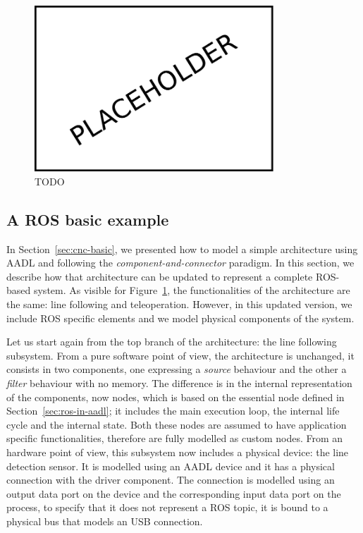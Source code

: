 \begin{figure}[t]
    \centering
    \includegraphics[width=0.8\textwidth]{gfx/placeholder}
    \caption{TODO}\label{fig:ros-arch}
\end{figure}

\subsection{A ROS basic example}
In Section~\ref{sec:cnc-basic}, we presented how to model a simple architecture using AADL and following the \textit{component-and-connector} paradigm. In this section, we describe how that architecture can be updated to represent a complete ROS-based system. As visible for Figure~\ref{fig:ros-arch}, the functionalities of the architecture are the same: line following and teleoperation. However, in this updated version, we include ROS specific elements and we model physical components of the system.

Let us start again from the top branch of the architecture: the line following subsystem. From a pure software point of view, the architecture is unchanged, it consists in two components, one expressing a \textit{source} behaviour and the other a \textit{filter} behaviour with no memory. The difference is in the internal representation of the components, now nodes, which is based on the essential node defined in Section~\ref{sec:ros-in-aadl}; it includes the main execution loop, the internal life cycle and the internal state. Both these nodes are assumed to have application specific functionalities, therefore are fully modelled as custom nodes. From an hardware point of view, this subsystem now includes a physical device: the line detection sensor. It is modelled using an AADL device and it has a physical connection with the driver component. The connection is modelled using an output data port on the device and the corresponding input data port on the process, to specify that it does not represent a ROS topic, it is bound to a physical bus that models an USB connection.


